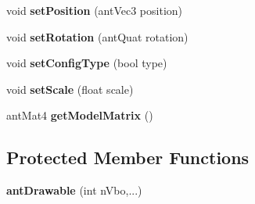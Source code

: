 \begin{DoxyCompactItemize}
\item 
\hypertarget{classant_drawable_a1e176180c5d98f7d43863e1db51e9205}{void {\bfseries set\+Position} (ant\+Vec3 position)}\label{classant_drawable_a1e176180c5d98f7d43863e1db51e9205}

\item 
\hypertarget{classant_drawable_adfd3f1b5e87ea18fac525e08f28695e1}{void {\bfseries set\+Rotation} (ant\+Quat rotation)}\label{classant_drawable_adfd3f1b5e87ea18fac525e08f28695e1}

\item 
\hypertarget{classant_drawable_a714be84ca5ecf84989e273249d8be954}{void {\bfseries set\+Config\+Type} (bool type)}\label{classant_drawable_a714be84ca5ecf84989e273249d8be954}

\item 
\hypertarget{classant_drawable_ab666efd2bca92495cce545977cd9e2b6}{void {\bfseries set\+Scale} (float scale)}\label{classant_drawable_ab666efd2bca92495cce545977cd9e2b6}

\item 
\hypertarget{classant_drawable_a128866275b3cead6d1a7224eddf7d9b6}{ant\+Mat4 {\bfseries get\+Model\+Matrix} ()}\label{classant_drawable_a128866275b3cead6d1a7224eddf7d9b6}

\end{DoxyCompactItemize}
\subsection*{Protected Member Functions}
\begin{DoxyCompactItemize}
\item 
\hypertarget{classant_drawable_af4a5b1c438c6e057e3579479a51ec220}{{\bfseries ant\+Drawable} (int n\+Vbo,...)}\label{classant_drawable_af4a5b1c438c6e057e3579479a51ec220}

\end{DoxyCompactItemize}
